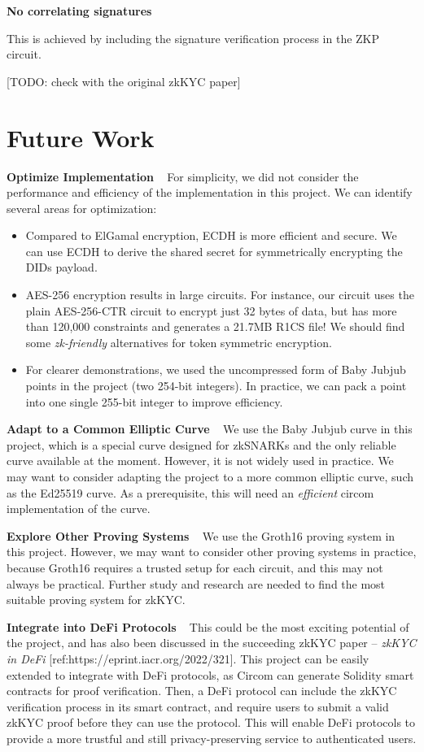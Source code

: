 \documentclass[
]{report}
\providecommand{\tightlist}{%
  \setlength{\itemsep}{0pt}\setlength{\parskip}{0pt}}
\begin{document}
\textbf{No correlating signatures}

This is achieved by including the signature verification process in the
ZKP circuit.

{[}TODO: check with the original zkKYC paper{]}

\chapter{Future Work}

\textbf{Optimize Implementation} ~ For simplicity, we did not consider
the performance and efficiency of the implementation in this project. We
can identify several areas for optimization:

\begin{itemize}
\tightlist
\item
  Compared to ElGamal encryption, ECDH is more efficient and secure. We
  can use ECDH to derive the shared secret for symmetrically encrypting
  the DIDs payload.
\item
  AES-256 encryption results in large circuits. For instance, our
  circuit uses the plain AES-256-CTR circuit to encrypt just 32 bytes of
  data, but has more than 120,000 constraints and generates a 21.7MB
  R1CS file! We should find some \emph{zk-friendly} alternatives for
  token symmetric encryption.
\item
  For clearer demonstrations, we used the uncompressed form of Baby
  Jubjub points in the project (two 254-bit integers). In practice, we
  can pack a point into one single 255-bit integer to improve
  efficiency.
\end{itemize}

\textbf{Adapt to a Common Elliptic Curve} ~ We use the Baby Jubjub curve
in this project, which is a special curve designed for zkSNARKs and the
only reliable curve available at the moment. However, it is not widely
used in practice. We may want to consider adapting the project to a more
common elliptic curve, such as the Ed25519 curve. As a prerequisite,
this will need an \emph{efficient} circom implementation of the curve.

\textbf{Explore Other Proving Systems} ~ We use the Groth16 proving
system in this project. However, we may want to consider other proving
systems in practice, because Groth16 requires a trusted setup for each
circuit, and this may not always be practical. Further study and
research are needed to find the most suitable proving system for zkKYC.

\textbf{Integrate into DeFi Protocols} ~ This could be the most exciting
potential of the project, and has also been discussed in the succeeding
zkKYC paper -- \emph{zkKYC in DeFi}
{[}ref:https://eprint.iacr.org/2022/321{]}. This project
can be easily extended to integrate with DeFi protocols, as Circom can
generate Solidity smart contracts for proof verification. Then, a DeFi
protocol can include the zkKYC verification process in its smart
contract, and require users to submit a valid zkKYC proof before they
can use the protocol. This will enable DeFi protocols to provide a more
trustful and still privacy-preserving service to authenticated users.
\end{document}
